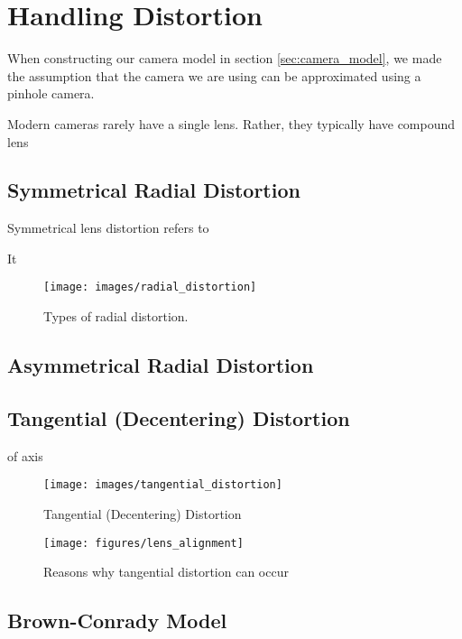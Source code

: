 \section{Handling Distortion}

When constructing our camera model in section \ref{sec:camera_model}, we made the assumption that the camera we are using can be approximated using a pinhole camera.


Modern cameras rarely have a single lens. Rather, they typically have compound lens




\subsection{Symmetrical Radial Distortion}

Symmetrical lens distortion refers to

It


\begin{figure}[H]
    \centering
    \texttt{[image: images/radial\_distortion]}
    \caption{Types of radial distortion.}
\end{figure}

\subsection{Asymmetrical Radial Distortion}

\subsection{Tangential (Decentering) Distortion}

of axis

\begin{figure}[H]
    \centering
    \texttt{[image: images/tangential\_distortion]}
    \caption{Tangential (Decentering) Distortion}
\end{figure}

\begin{figure}[H]
    \centering
    \texttt{[image: figures/lens\_alignment]}
    \caption{Reasons why tangential distortion can occur}
\end{figure}

\subsection{Brown-Conrady Model}
